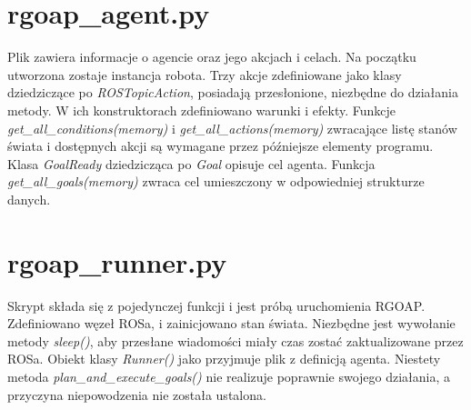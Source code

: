 \section*{rgoap\_agent.py}
Plik zawiera informacje o agencie oraz jego akcjach i celach. Na początku utworzona zostaje instancja robota. Trzy akcje zdefiniowane jako klasy dziedziczące po \textit{ROSTopicAction}, posiadają przesłonione, niezbędne do działania metody. W ich konstruktorach zdefiniowano warunki i efekty. Funkcje \textit{get\_all\_conditions(memory)} i \textit{get\_all\_actions(memory)} zwracające listę stanów świata i dostępnych akcji są wymagane przez późniejsze elementy programu. Klasa \textit{GoalReady} dziedzicząca po \textit{Goal} opisuje cel agenta. Funkcja \textit{get\_all\_goals(memory)} zwraca cel umieszczony w odpowiedniej strukturze danych.


\section*{rgoap\_runner.py}
Skrypt składa się z pojedynczej funkcji i jest próbą uruchomienia RGOAP. Zdefiniowano węzeł ROSa, i zainicjowano stan świata. Niezbędne jest wywołanie metody \textit{sleep()}, aby przesłane wiadomości miały czas zostać zaktualizowane przez ROSa. Obiekt klasy \textit{Runner()} jako przyjmuje plik z definicją agenta. Niestety metoda \textit{plan\_and\_execute\_goals()} nie realizuje poprawnie swojego działania, a przyczyna niepowodzenia nie została ustalona.

